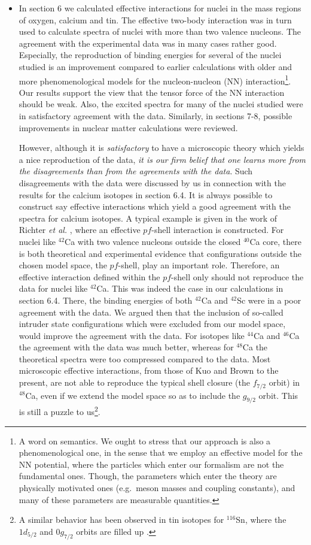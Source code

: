 \begin{itemize}
\item


In section 6 we calculated effective interactions for
nuclei in the mass regions of oxygen, calcium  and tin.
The effective
two-body interaction was in turn used to calculate spectra of
nuclei with more than two valence nucleons. The agreement with the
experimental data was in many cases rather good.
Especially, the reproduction
of binding energies for several of the nuclei studied
is an improvement compared to earlier calculations with
older and more phenomenological
models for the nucleon-nucleon (NN)
interaction\footnote{A word on semantics. We ought to stress
that our approach is also a phenomenological one, in the sense that
we employ an effective model for the NN potential, where the
particles which enter our formalism are not the
fundamental ones. Though, the parameters which
enter the theory are physically motivated ones (e.g.\ meson masses
and coupling constants), and many
of these parameters are measurable quantities.}. Our results support
the view that the tensor force of the NN interaction should
be weak. Also, the excited spectra for many of the
nuclei studied were in satisfactory agreement with the
data. Similarly, in sections 7-8, possible improvements
in nuclear matter calculations were reviewed.

However, although it is {\em satisfactory} to have
a microscopic theory which yields a nice reproduction
of the data, {\em it is our firm belief
that one learns more from the disagreements
than from the agreements with the data}.
Such disagreements with the data were discussed by us in
connection with the results for the calcium isotopes in section
6.4.
It is always possible
to construct say effective interactions which yield
a good agreement with the spectra for
calcium isotopes. A typical example is given in the
work of Richter {\em et al.} \cite{richt91}, where
an effective $pf$-shell interaction is constructed. For nuclei
like $^{42}$Ca with two valence nucleons outside the closed
$^{40}$Ca core, there is both theoretical and experimental
evidence that configurations outside the chosen model space,
the $pf$-shell, play an important role. Therefore,
an effective interaction defined within the $pf$-shell
only should not reproduce the data for nuclei like $^{42}$Ca.
This was indeed the case in our calculations in section 6.4.
There, the binding energies of both $^{42}$Ca and $^{42}$Sc
were in a poor agreement with the data. We argued then that
the inclusion of
so-called intruder state configurations which were excluded
from our model space, would improve the agreement with the data.
For isotopes like $^{44}$Ca and $^{46}$Ca the agreement with
the data was much better, whereas for $^{48}$Ca the
theoretical spectra
were too compressed compared to the data. Most microscopic
effective interactions, from those of Kuo and Brown \cite{kb68}
to the present, are not able to reproduce the typical shell
closure (the $f_{7/2}$ orbit) in $^{48}$Ca, even if we extend
the model space so as to include the $g_{9/2}$ orbit.
This is still a puzzle to us\footnote{A similar behavior has been
observed in tin isotopes for $^{116}$Sn, where the $1d_{5/2}$
and $0g_{7/2}$ orbits are filled up \cite{eng94}.}.


\end{itemize}
